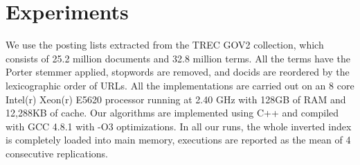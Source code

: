 \documentclass[runningheads,a4paper]{llncs}
\begin{document}

\section{Experiments}
We use the posting lists extracted from the TREC GOV2 collection, which consists of 25.2 million documents and 32.8 million terms. All the terms have the Porter stemmer applied, stopwords are removed, and docids are reordered by the lexicographic order of URLs. All the implementations are carried out on an 8 core Intel(r) Xeon(r) E5620 processor running at 2.40 GHz with 128GB of RAM and 12,288KB of cache. Our algorithms are implemented using C++ and compiled with GCC 4.8.1 with -O3 optimizations. In all our runs, the whole inverted index is completely loaded into main memory, executions are reported as the mean of 4 consecutive replications.
\end{document}
